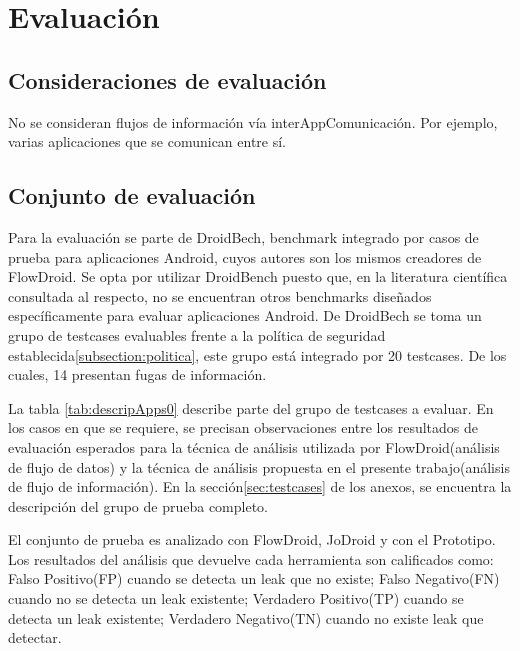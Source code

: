 \label{ch:evaluacion}
\chapter{Evaluación}

\section{Consideraciones de evaluación}
No se consideran flujos de información vía interAppComunicación. Por ejemplo,
varias aplicaciones que se comunican entre sí.

\section{Conjunto de evaluación}
\label{sec:evalSet}
Para la evaluación se parte de DroidBech\cite{DroidBenchBenchmarks}, benchmark
integrado por casos de prueba para aplicaciones Android, cuyos autores son los
mismos creadores de FlowDroid. Se opta por utilizar DroidBench puesto que, en la
literatura científica consultada al respecto, no se encuentran otros benchmarks
diseñados específicamente para evaluar aplicaciones Android.\newline 
De DroidBech se toma un grupo de testcases evaluables frente a la política de
seguridad establecida\ref{subsection:politica}, este grupo está integrado por 20
testcases. De los cuales, 14 presentan fugas de información.

La tabla \ref{tab:descripApps0} describe parte del grupo de testcases a
evaluar. En los casos en que se requiere, se precisan observaciones entre los
resultados de evaluación esperados para la técnica de análisis utilizada por
FlowDroid(análisis de flujo de datos) y la técnica de análisis propuesta en el
presente trabajo(análisis de flujo de información).
En la sección\ref{sec:testcases} de los anexos, se encuentra la
descripción del grupo de prueba completo.

El conjunto de prueba es analizado con FlowDroid, JoDroid y con el Prototipo. Los
resultados del análisis que devuelve cada herramienta son calificados como:
Falso Positivo(FP) cuando se detecta un leak que no existe; Falso Negativo(FN)
cuando no se detecta un leak existente; Verdadero Positivo(TP) cuando se detecta
un leak existente; Verdadero Negativo(TN) cuando no existe leak que detectar.

